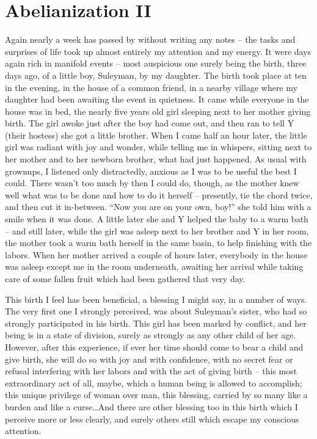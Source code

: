 










\chapter{Abelianization II}
\label{ch:VII}

\presectionfill{}\par

\label{sec:133}%
Again nearly a week has passed by without writing any notes -- the
tasks and surprises of life took up almost entirely my attention and
my energy. It were days again rich in manifold events -- most
auspicious one surely being the birth, three days ago, of a little
boy, Suleyman, by my daughter. The birth took place at ten in the
evening, in the house of a common friend, in a nearby village where my
daughter had been awaiting the event in quietness. It came while
everyone in the house was in bed, the nearly five years old girl
sleeping next to her mother giving birth. The girl awoke just after
the boy had come out, and then ran to tell Y (their hostess) she got a
little brother. When I came half an hour later, the little girl was
radiant with joy and wonder, while telling me in whispers, sitting
next to her mother and to her newborn brother, what had just
happened. As usual with grownups, I listened only distractedly,
anxious as I was to be useful the best I could. There wasn't too much
by then I could do, though, as the mother knew well what was to be
done and how to do it herself -- presently, tie the chord twice, and
then cut it in-between. ``Now you are on your own, boy!'' she told him
with a smile when it was done. A little later she and Y helped the
baby to a warm bath -- and still later, while the girl was asleep next
to her brother and Y in her room, the mother took a warm bath herself
in the same basin, to help finishing with the labors. When her mother
arrived a couple of hours later, everybody in the house was asleep
except me in the room underneath, awaiting her arrival while taking
care of some fallen fruit which had been gathered that very day.

This birth I feel has been beneficial, a blessing I might say, in a
number of ways. The very first one I strongly perceived, was about
Suleyman's sister, who had so strongly participated in his birth. This
girl has been marked by conflict, and her being is in a state of
division, surely as strongly as any other child of her age. However,
after this experience, if ever her time should come to bear a child
and give birth, she will do so with joy and with confidence, with no
secret fear or refusal interfering with her labors and with the act of
giving birth -- this most extraordinary act of all, maybe, which a
human being is allowed to accomplish; this unique privilege of woman
over man, this blessing, carried by so many like a burden and like a
curse\dots\enspace And there are other blessing too in this birth
which I perceive more or less clearly, and surely others still which
escape my conscious attention.

